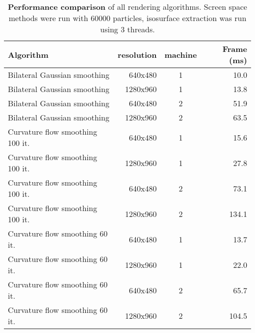 \begin{table}
   \caption[Performance comparison]{\textbf{Performance comparison} of all rendering algorithms. Screen space methods were run with 60000 particles, isosurface extraction was run using 3 threads.}
   \centering
   \begin{tabular} { l | r | c | r }
      Algorithm                                       &            resolution              &          machine           &          Frame (ms)      \\ \hline \hline
      Bilateral Gaussian smoothing        &           640x480                &              1                  &           10.0                    \\ \hline
      Bilateral Gaussian smoothing        &           1280x960              &              1                  &           13.8                    \\ \hline
      Bilateral Gaussian smoothing        &           640x480                &              2                  &           51.9                    \\ \hline
      Bilateral Gaussian smoothing        &           1280x960              &              2                  &           63.5                    \\ \hline \hline

      Curvature flow smoothing 100 it. &           640x480                &              1                  &           15.6                    \\ \hline
      Curvature flow smoothing 100 it. &          1280x960               &              1                  &           27.8                    \\ \hline
      Curvature flow smoothing 100 it. &           640x480                &              2                  &           73.1                    \\ \hline
      Curvature flow smoothing 100 it. &          1280x960               &              2                  &           134.1                  \\ \hline \hline

      Curvature flow smoothing 60 it.   &           640x480                &              1                  &           13.7                \\ \hline
      Curvature flow smoothing 60 it.   &          1280x960               &              1                  &           22.0                \\ \hline
      Curvature flow smoothing 60 it.   &           640x480                &              2                  &           65.7                    \\ \hline
      Curvature flow smoothing 60 it.   &          1280x960               &              2                  &           104.5               \\ \hline \hline


\end{tabular}
\end{table}

